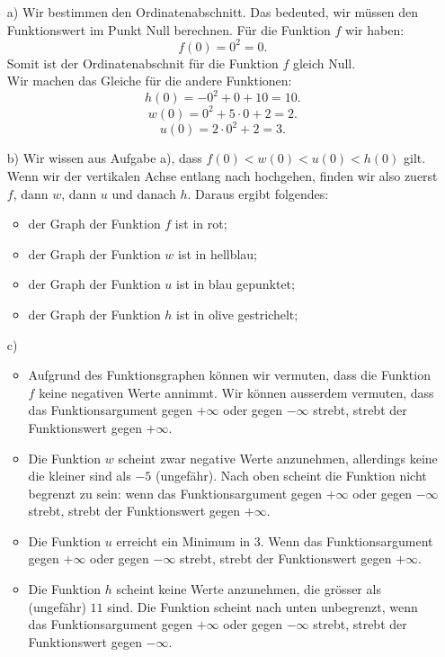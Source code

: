 \documentclass[12pt]{article}
\begin{document}
\begin{solution}
\begin{enumerate}
\item[a)] Wir bestimmen den Ordinatenabschnitt. Das bedeuted, wir müssen den Funktionswert im Punkt Null berechnen. Für die Funktion $f$ wir haben:
$$f(0)=0^{2}=0.$$
Somit ist der Ordinatenabschnit für die Funktion $f$ gleich Null. \\
Wir machen das Gleiche für die andere Funktionen:
$$h(0)=-0^{2}+0+10=10.$$
$$w(0)=0^{2}+5\cdot 0+2=2.$$
$$u(0)=2\cdot 0^{2}+2=3.$$
\item[b)]
Wir wissen aus Aufgabe a), dass $f(0) < w(0) < u(0) < h(0)$ gilt. Wenn wir der vertikalen Achse entlang nach hochgehen, finden wir also zuerst $f$, dann $w$, dann $u$ und danach $h$. Daraus ergibt folgendes:
\begin{itemize}
\item der Graph der Funktion $f$ ist in rot; \\
\item der Graph der Funktion $w$ ist in hellblau; \\
\item der Graph der Funktion $u$ ist in blau gepunktet; \\
\item der Graph der Funktion $h$ ist in olive gestrichelt; \\
\end{itemize}
\item[c)] \begin{itemize}
\item Aufgrund des Funktionsgraphen können wir vermuten, dass die Funktion $f$ keine negativen Werte annimmt. Wir können ausserdem vermuten, dass das Funktionsargument gegen $+\infty$ oder gegen $-\infty$ strebt, strebt der Funktionswert gegen $+\infty$. \\
\item Die Funktion $w$ scheint zwar negative Werte anzunehmen, allerdings keine die kleiner sind als $-5$ (ungefähr). Nach oben scheint die Funktion nicht begrenzt zu sein: wenn das Funktionsargument gegen $+\infty$ oder gegen $-\infty$ strebt, strebt der Funktionswert gegen $+\infty$. \\
\item Die Funktion $u$ erreicht ein Minimum in $3$. Wenn das Funktionsargument gegen $+\infty$ oder gegen $-\infty$ strebt, strebt der Funktionswert gegen $+\infty$.
\item Die Funktion $h$ scheint keine Werte anzunehmen, die grösser als (ungefähr) $11$ sind. Die Funktion scheint nach unten unbegrenzt, wenn das Funktionsargument gegen $+\infty$ oder gegen $-\infty$ strebt, strebt der Funktionswert gegen $-\infty$.\\
\end{itemize}


\end{enumerate}
\end{solution}
\end{document}
